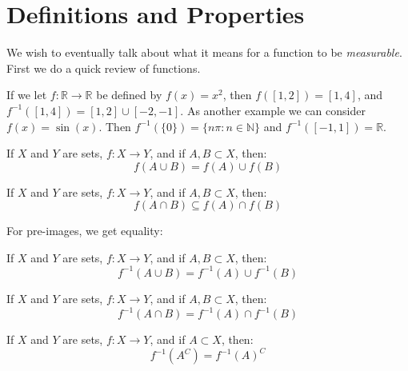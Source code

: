 \section{Definitions and Properties}
    We wish to eventually talk about what it means for a function to be
    \textit{measurable}. First we do a quick review of functions.
    \begin{lexample}
        If we let $f:\mathbb{R}\rightarrow\mathbb{R}$ be defined by
        $f(x)=x^{2}$, then $f([1,2])=[1,4]$, and
        $f^{-1}([1,4])=[1,2]\cup[-2,-1]$. As another example we can consider
        $f(x)=\sin(x)$. Then $f^{-1}(\{0\})=\{n\pi:n\in\mathbb{N}\}$ and
        $f^{-1}([-1,1])=\mathbb{R}$.
    \end{lexample}
    \begin{theorem}
        If $X$ and $Y$ are sets, $f:X\rightarrow{Y}$, and if $A,B\subset{X}$,
        then:
        \begin{equation}
            f(A\cup{B})=f(A)\cup{f}(B)
        \end{equation}
    \end{theorem}
    \begin{theorem}
        If $X$ and $Y$ are sets, $f:X\rightarrow{Y}$, and if $A,B\subset{X}$,
        then:
        \begin{equation}
            f(A\cap{B})\subseteq{f(A)\cap{f}(B)}
        \end{equation}
    \end{theorem}
    For pre-images, we get equality:
    \begin{theorem}
        If $X$ and $Y$ are sets, $f:X\rightarrow{Y}$, and if $A,B\subset{X}$,
        then:
        \begin{equation}
            f^{-1}(A\cup{B})=f^{-1}(A)\cup{f}^{-1}(B)
        \end{equation}
    \end{theorem}
    \begin{theorem}
        If $X$ and $Y$ are sets, $f:X\rightarrow{Y}$, and if $A,B\subset{X}$,
        then:
        \begin{equation}
            f^{-1}(A\cap{B})=f^{-1}(A)\cap{f}^{-1}(B)
        \end{equation}
    \end{theorem}
    \begin{theorem}
        If $X$ and $Y$ are sets, $f:X\rightarrow{Y}$, and if $A\subset{X}$,
        then:
        \begin{equation}
            f^{-1}(A^{C})=f^{-1}(A)^{C}
        \end{equation}
    \end{theorem}
